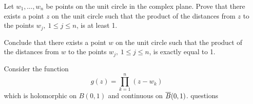 \documentclass[12pt]{memoir}
\begin{document}
\begin{Ej}
    Let $w_1,\dots , w_n$ be points on the unit circle in the complex plane. Prove that there exists a point $z$ on the unit circle such that the product of the distances from $z$ to the points $w_j,\ 1\leq j\leq n$, is at least 1.\par
    Conclude that there exists a point $w$ on the unit circle such that the product of the distances from $w$ to the points $w_j,\ 1\leq j\leq n$, is exactly equal to 1.
\end{Ej}
\begin{ptcbr}
Consider the function 
$$g(z)=\prod_{k=1}^{n}(z-w_k)$$
which is holomorphic on $B(0,1)$ and continuous on $\overline B(0,1)$.    questions
\end{ptcbr}
\end{document}
